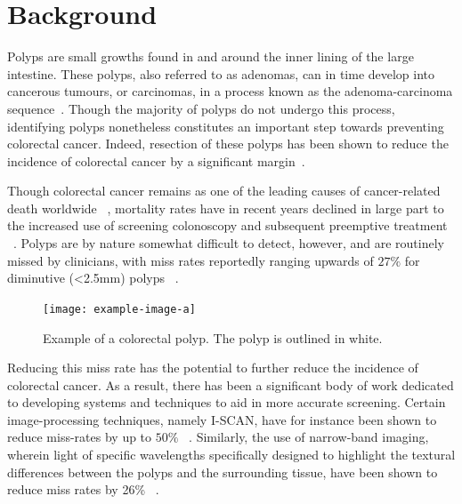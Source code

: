 \chapter{Background} \label{background}
% 


Polyps are small growths found in and around the inner lining of the large intestine. These polyps, also referred to as adenomas, can in time develop into cancerous tumours, or carcinomas, in a process known as the adenoma-carcinoma sequence~\cite{ACS}. Though the majority of polyps do not undergo this process, identifying polyps nonetheless constitutes an important step towards preventing colorectal cancer. Indeed, resection of these polyps has been shown to reduce the incidence of colorectal cancer by a significant margin~\cite{resection}. 

Though colorectal cancer remains as one of the leading causes of cancer-related death worldwide ~\cite{colorectal_cancer}, mortality rates have in recent years declined in large part to the increased use of screening colonoscopy and subsequent preemptive treatment ~\cite{screening}. Polyps are by nature somewhat difficult to detect, however, and are routinely missed by clinicians, with miss rates reportedly ranging upwards of $27\%$ for diminutive (<2.5mm) polyps ~\cite{missrate1, missrate2}.
\begin{figure}
    \centering
    \texttt{[image: example-image-a]}
    \caption{Example of a colorectal polyp. The polyp is outlined in white.}
    \label{fig:polyp}
\end{figure}
Reducing this miss rate has the potential to further reduce the incidence of colorectal cancer. As a result, there has been a significant body of work dedicated to developing systems and techniques to aid in more accurate screening. Certain image-processing techniques, namely I-SCAN, have for instance been shown to reduce miss-rates by up to $50\%$ ~\cite{i-scan}. Similarly, the use of narrow-band imaging, wherein light of specific wavelengths specifically designed to highlight the textural differences between the polyps and the surrounding tissue, have been shown to reduce miss rates by 26\% ~\cite{nbi}. 

